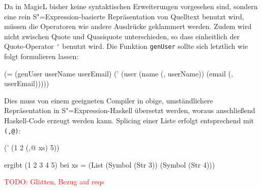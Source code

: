 \documentclass[12pt, a4paper, bibgerm]{scrbook}
\newenvironment{DIFnomarkup}{}{}
\newcommand\icode[1]{\lstinline?#1?}
\newcommand{\todo}[1]{
  \textcolor{red}{TODO: #1}
}
\newcommand{\sexp}{S"=Expression}
\begin{document}
Da in MagicL bisher keine syntaktischen Erweiterungen vorgesehen sind,
sondern eine rein \sexp{}-basierte Repräsentation von Quelltext benutzt
wird, müssen die Operatoren wie andere Ausdrücke geklammert
werden. Zudem wird nicht zwischen Quote und Quasiquote unterschieden, so
dass einheitlich der Quote-Operator \icode{'} benutzt wird. Die Funktion
\icode{genUser} sollte sich letztlich wie folgt formulieren lassen:
\begin{DIFnomarkup}\begin{code}
(= (genUser userName userEmail)
   (' (user (name (, userName)) (email (, userEmail)))))
\end{code}\end{DIFnomarkup}
Dies muss von einem geeigneten Compiler in obige, umständlichere
Repräsentation in \sexp{}-Haskell übersetzt werden, woraus anschließend
Haskell-Code erzeugt werden kann. Splicing einer Liste erfolgt
entsprechend mit \icode{(,@)}:
\begin{DIFnomarkup}\begin{code}
(' (1 2 (,@ xs) 5))

ergibt (1 2 3 4 5) bei xs = (List (Symbol (Str 3))
                                  (Symbol (Str 4)))
\end{code}\end{DIFnomarkup}


\todo{Glätten, Bezug auf reqs}
\end{document}
